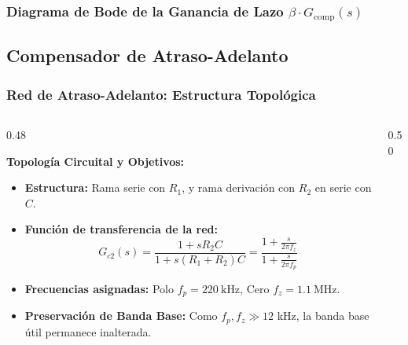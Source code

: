 \begin{frame}
  \frametitle{Diagrama de Bode de la Ganancia de Lazo $\beta \cdot G_{\text{comp}}(s)$}

  \centering
\end{frame}

\subsection{Compensador de Atraso-Adelanto}
\begin{frame}
  \frametitle{Red de Atraso-Adelanto: Estructura Topológica}

  \begin{columns}[c, onlytextwidth]
    \begin{column}{0.48\textwidth}
      \begin{tarjeta}
        {\fontsize{8.5pt}{10.5pt}\selectfont \textbf{\color{NavyDark} Topología Circuital y Objetivos:}}\\[2pt]
        {\fontsize{7.5pt}{9.2pt}\selectfont
        \begin{itemize}\setlength{\itemsep}{2pt}
          \item \textbf{Estructura:} Rama serie con $R_1$, y rama derivación con $R_2$ en serie con $C$.
          \item \textbf{Función de transferencia de la red:}
          \[ G_{c2}(s) = \frac{1 + s R_2 C}{1 + s (R_1 + R_2) C} = \frac{1 + \frac{s}{2\pi f_z}}{1 + \frac{s}{2\pi f_p}} \]
          \item \textbf{Frecuencias asignadas:}
          Polo $f_p = \qty{220}{\kilo\hertz}$, Cero $f_z = \qty{1.1}{\mega\hertz}$.
          \item \textbf{Preservación de Banda Base:}
          Como $f_p, f_z \gg 12\text{ kHz}$, la banda base útil permanece inalterada.
        \end{itemize}
        }
      \end{tarjeta}
    \end{column}

    \begin{column}{0.50\textwidth}
      \centering
    \end{column}
  \end{columns}
\end{frame}

